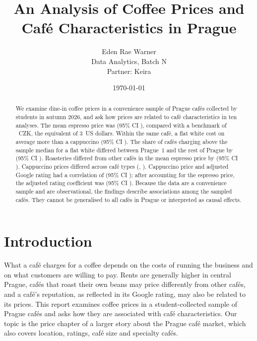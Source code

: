 \documentclass[11pt,a4paper]{article}
\title{\textbf{An Analysis of Coffee Prices and Caf\'e Characteristics in Prague}}
\author{Eden Rae Warner\\Data Analytics, Batch N\\Partner: Keira}
\date{\today}
\begin{document}
\maketitle

\begin{abstract}
We examine dine-in coffee prices in a convenience sample of \ATotal{} Prague caf\'es collected by students in autumn 2026, and ask how prices are related to caf\'e characteristics in ten analyses. The mean espresso price was \AOneEst{} (95\% CI \AOneCI{}), compared with a benchmark of \AOneBench{}~CZK, the equivalent of 3~US dollars. Within the same caf\'e, a flat white cost on average \AThreeEst{} more than a cappuccino (95\% CI \AThreeCI{}). The share of caf\'es charging above the sample median for a flat white differed between Prague~1 and the rest of Prague by \AFiveEst{} (95\% CI \AFiveCI{}). Roasteries differed from other caf\'es in the mean espresso price by \ATwoEst{} (95\% CI \ATwoCI{}). Cappuccino prices differed across caf\'e types (\AFourTest{}, \AFourP{}). Cappuccino price and adjusted Google rating had a correlation of \ASixEst{} (95\% CI \ASixCI{}); after accounting for the espresso price, the adjusted rating coefficient was \AEightEst{} (95\% CI \AEightCI{}). Because the data are a convenience sample and are observational, the findings describe associations among the sampled caf\'es. They cannot be generalised to all caf\'es in Prague or interpreted as causal effects.
\end{abstract}

\section{Introduction}

What a caf\'e charges for a coffee depends on the costs of running the business and on what customers are willing to pay. Rents are generally higher in central Prague, caf\'es that roast their own beans may price differently from other caf\'es, and a caf\'e's reputation, as reflected in its Google rating, may also be related to its prices. This report examines coffee prices in a student-collected sample of \ATotal{} Prague caf\'es and asks how they are associated with caf\'e characteristics. Our topic is the price chapter of a larger story about the Prague caf\'e market, which also covers location, ratings, caf\'e size and specialty caf\'es.
\end{document}
